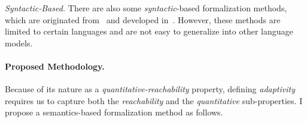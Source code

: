\emph{{Syntactic}-Based.} There are also some \emph{syntactic}-based formalization methods, which are originated from~\cite{Weiser84} and developed in~\cite{DenningD77}.
However, these methods are limited to certain languages and are not easy to generalize into other language models.

%
\paragraph{Proposed Methodology.}
Because of its nature as a \emph{quantitative-reachability} property, defining \emph{adaptivity} requires us to capture
both
the \emph{reachability} and the \emph{quantitative} sub-properties.
I propose a semantics-based formalization method as follows.

